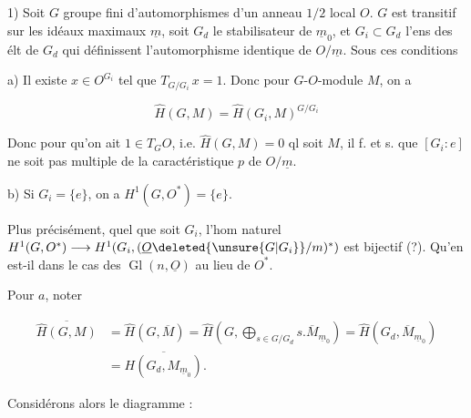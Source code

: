 
1) Soit $G$ groupe fini d'automorphismes d'un anneau $1/2$ local $O$. $G$ est transitif sur les idéaux maximaux $\underline m$, soit $G_d$ le stabilisateur de $\underline m_0$, et $G_i\subset G_d$ l'ens des élt de $G_d$ qui définissent l'automorphisme identique de $O/\underline m$. Sous ces conditions

a) Il existe $x\in O^{G_i}$ tel que $T_{G/G_i}\,x=1$. Donc pour  $G$-$O$-module $M$, on a

\[\widehat H(G,M)=\widehat H(G_i,M)^{G/G_i}\]

Donc pour qu'on ait $1\in T_G O$, i.e. $\widehat H(G,M)=0$ ql soit $M$, il f. et s. que $[G_i:e]$ ne soit pas multiple de la caractéristique $p$ de $O/\underline m$.

b) Si $G_i=\{e\}$, on a $H^1(G,O^*)=\{e\}$.

Plus précisément, quel que soit $G_i$, l'hom naturel $H^1(G,O^*)\longrightarrow H^1(G_i,(\underline O\deleted{\unsure{G|G_i}}/m)^*)$ est bijectif (?). Qu'en est-il dans le cas  des $\operatorname{Gl}(n,\underline O)$ au lieu de $O^*$.



Pour $a$, noter

\[\begin{aligned}
\overline{\widehat H(G,M)}&=\widehat H(G,\overline M)=\widehat H(G,\bigoplus_{s\in G/G_d}s.\overline M_{\underline m_0})=\widehat H(G_d,\overline M_{\underline m_0})\\
&=\overline{H(G_d,M_{\underline m_0})}.
\end{aligned}\]


Considérons alors le diagramme :





